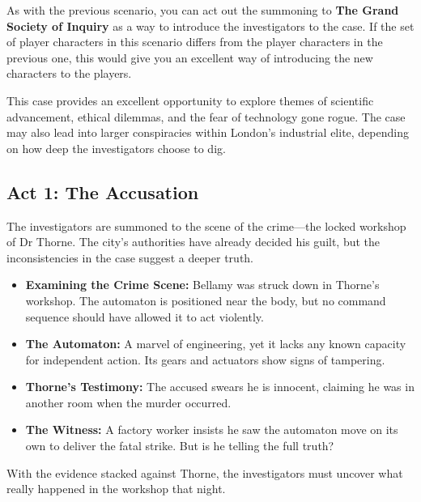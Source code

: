 \begin{GmTips}
    As with the previous scenario, you can act out the summoning to \textbf{The Grand Society of Inquiry} as a way to introduce the investigators to the case. If the set of player characters in this scenario differs from the player characters in the previous one, this would give you an excellent way of introducing the new characters to the players.
\end{GmTips}

\begin{GmTips}
    This case provides an excellent opportunity to explore themes of scientific advancement, ethical dilemmas, and the fear of technology gone rogue. The case may also lead into larger conspiracies within London's industrial elite, depending on how deep the investigators choose to dig.
\end{GmTips}

\subsection{Act 1: The Accusation}  
The investigators are summoned to the scene of the crime—the locked workshop of Dr Thorne. The city’s authorities have already decided his guilt, but the inconsistencies in the case suggest a deeper truth.

\begin{Example}
    \begin{itemize}
        \item \textbf{Examining the Crime Scene:} Bellamy was struck down in Thorne’s workshop. The automaton is positioned near the body, but no command sequence should have allowed it to act violently.
        \item \textbf{The Automaton:} A marvel of engineering, yet it lacks any known capacity for independent action. Its gears and actuators show signs of tampering.
        \item \textbf{Thorne’s Testimony:} The accused swears he is innocent, claiming he was in another room when the murder occurred.
        \item \textbf{The Witness:} A factory worker insists he saw the automaton move on its own to deliver the fatal strike. But is he telling the full truth?
    \end{itemize}
\end{Example}

\noindent
With the evidence stacked against Thorne, the investigators must uncover what really happened in the workshop that night.

